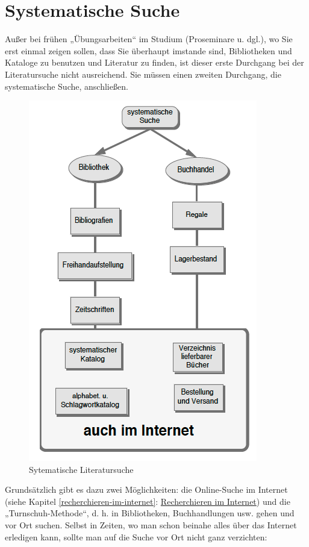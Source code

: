 \documentclass[]{book}
\theoremstyle{definition}
\theoremstyle{definition}
\theoremstyle{definition}
\theoremstyle{remark}
\begin{document}
\section{Systematische Suche}\label{systematische-suche}

Außer bei frühen „Übungsarbeiten`` im Studium (Proseminare u. dgl.), wo
Sie erst einmal zeigen sollen, dass Sie überhaupt imstande sind,
Bibliotheken und Kataloge zu benutzen und Literatur zu finden, ist
dieser erste Durchgang bei der Literatursuche nicht ausreichend. Sie
müssen einen zweiten Durchgang, die systematische Suche, anschließen.

\begin{figure}

{\centering \includegraphics{images/recherchieren-literatursuche-systematisch-min} 

}

\caption{Sytematische Literatursuche}\label{fig:unnamed-chunk-6}
\end{figure}

Grundsätzlich gibt es dazu zwei Möglichkeiten: die Online-Suche im
Internet (siehe Kapitel \ref{recherchieren-im-internet}:
\protect\hyperlink{recherchieren-im-internet}{Recherchieren im
Internet}) und die „Turnschuh-Methode``, d. h. in Bibliotheken,
Buchhandlungen usw. gehen und vor Ort suchen. Selbst in Zeiten, wo man
schon beinahe alles über das Internet erledigen kann, sollte man auf die
Suche vor Ort nicht ganz verzichten:
\end{document}
